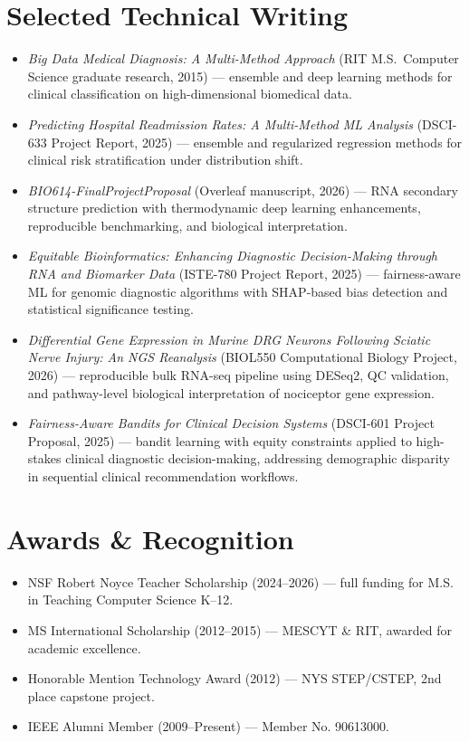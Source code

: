 \documentclass[11pt]{article}
\begin{document}
\section{Selected Technical Writing}
\begin{itemize}
  \item \textit{Big Data Medical Diagnosis: A Multi-Method Approach} (RIT M.S.\ Computer Science graduate research, 2015) --- ensemble and deep learning methods for clinical classification on high-dimensional biomedical data.
  \item \textit{Predicting Hospital Readmission Rates: A Multi-Method ML Analysis} (DSCI-633 Project Report, 2025) --- ensemble and regularized regression methods for clinical risk stratification under distribution shift.
  \item \textit{BIO614-FinalProjectProposal} (Overleaf manuscript, 2026) --- RNA secondary structure prediction with thermodynamic deep learning enhancements, reproducible benchmarking, and biological interpretation.
  \item \textit{Equitable Bioinformatics: Enhancing Diagnostic Decision-Making through RNA and Biomarker Data} (ISTE-780 Project Report, 2025) --- fairness-aware ML for genomic diagnostic algorithms with SHAP-based bias detection and statistical significance testing.
  \item \textit{Differential Gene Expression in Murine DRG Neurons Following Sciatic Nerve Injury: An NGS Reanalysis} (BIOL550 Computational Biology Project, 2026) --- reproducible bulk RNA-seq pipeline using DESeq2, QC validation, and pathway-level biological interpretation of nociceptor gene expression.
  \item \textit{Fairness-Aware Bandits for Clinical Decision Systems} (DSCI-601 Project Proposal, 2025) --- bandit learning with equity constraints applied to high-stakes clinical diagnostic decision-making, addressing demographic disparity in sequential clinical recommendation workflows.
\end{itemize}

\section{Awards \& Recognition}
\begin{itemize}
  \item NSF Robert Noyce Teacher Scholarship (2024--2026) --- full funding for M.S. in Teaching Computer Science K--12.
  \item MS International Scholarship (2012--2015) --- MESCYT \& RIT, awarded for academic excellence.
  \item Honorable Mention Technology Award (2012) --- NYS STEP/CSTEP, 2nd place capstone project.
  \item IEEE Alumni Member (2009--Present) --- Member No. 90613000.
\end{itemize}
\end{document}

